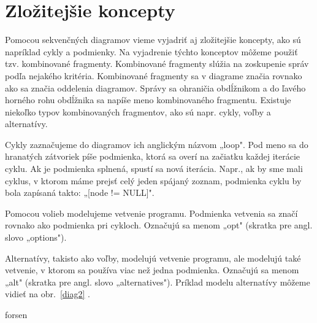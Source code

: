 \documentclass[10pt,slovak,a4paper]{article}
\begin{document}
\section{Zložitejšie koncepty}

Pomocou sekvenčných diagramov vieme vyjadriť aj zložitejšie koncepty, ako sú napríklad cykly a podmienky. Na vyjadrenie týchto konceptov môžeme použiť tzv. kombinované fragmenty.
Kombinované fragmenty slúžia na zoskupenie správ podľa nejakého kritéria. 
Kombinované fragmenty sa v diagrame značia rovnako ako sa značia oddelenia diagramov. Správy sa ohraničia obdĺžnikom a do ľavého horného rohu obdĺžnika sa napíše meno 
kombinovaného fragmentu. Existuje niekoľko typov kombinovaných fragmentov, ako sú napr. cykly, voľby a alternatívy. \cite{booch00} \newline

\noindent Cykly zaznačujeme do diagramov ich anglickým názvom „loop". Pod meno sa do hranatých zátvoriek píše podmienka, ktorá sa overí na začiatku každej iterácie cyklu. 
Ak je podmienka splnená, spustí sa nová iterácia. 
Napr., ak by sme mali cyklus, v ktorom máme prejsť celý jeden spájaný zoznam, podmienka cyklu by bola zapísaná takto: „[node != NULL]". \cite{booch00} \newline

\noindent Pomocou volieb modelujeme vetvenie programu. Podmienka vetvenia sa značí rovnako ako podmienka pri cykloch. 
Označujú sa menom „opt" (skratka pre angl. slovo „options"). \cite{booch00} \newline

\noindent Alternatívy, takisto ako voľby, modelujú vetvenie programu, ale modelujú také vetvenie, v ktorom sa používa viac než jedna podmienka. 
Označujú sa menom „alt" (skratka pre angl. slovo „alternatives"). 
Príklad modelu alternatívy môžeme vidieť na obr.~\ref{diag2} . \cite{booch00} \newline

\noindent forsen
\end{document}
